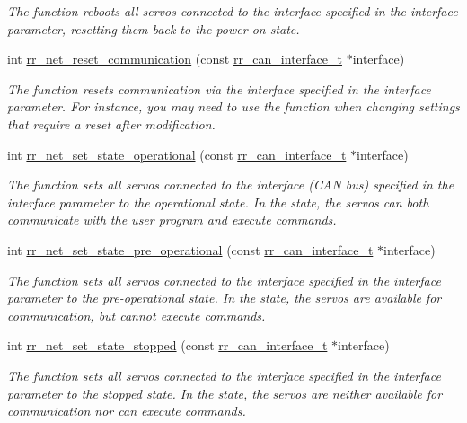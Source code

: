 \begin{DoxyCompactItemize}
\begin{DoxyCompactList}\small\item\em The function reboots all servos connected to the interface specified in the \textquotesingle{}interface\textquotesingle{} parameter, resetting them back to the power-\/on state. \end{DoxyCompactList}\item 
int \hyperlink{group___state_ga7591c01ec4b20388fad7effe3266e3b1}{rr\+\_\+net\+\_\+reset\+\_\+communication} (const \hyperlink{structrr__can__interface__t}{rr\+\_\+can\+\_\+interface\+\_\+t} $\ast$interface)
\begin{DoxyCompactList}\small\item\em The function resets communication via the interface specified in the \textquotesingle{}interface\textquotesingle{} parameter. For instance, you may need to use the function when changing settings that require a reset after modification. \end{DoxyCompactList}\item 
int \hyperlink{group___state_ga427f81205fc35a78a351d1288ea67165}{rr\+\_\+net\+\_\+set\+\_\+state\+\_\+operational} (const \hyperlink{structrr__can__interface__t}{rr\+\_\+can\+\_\+interface\+\_\+t} $\ast$interface)
\begin{DoxyCompactList}\small\item\em The function sets all servos connected to the interface (C\+AN bus) specified in the \textquotesingle{}interface\textquotesingle{} parameter to the operational state. In the state, the servos can both communicate with the user program and execute commands. \end{DoxyCompactList}\item 
int \hyperlink{group___state_ga6a6c46f69a8586cf7bd129a55a775eb7}{rr\+\_\+net\+\_\+set\+\_\+state\+\_\+pre\+\_\+operational} (const \hyperlink{structrr__can__interface__t}{rr\+\_\+can\+\_\+interface\+\_\+t} $\ast$interface)
\begin{DoxyCompactList}\small\item\em The function sets all servos connected to the interface specified in the \textquotesingle{}interface\textquotesingle{} parameter to the pre-\/operational state. In the state, the servos are available for communication, but cannot execute commands. \end{DoxyCompactList}\item 
int \hyperlink{group___state_ga7dd178eafeae0d80edd60e3aee6e13b9}{rr\+\_\+net\+\_\+set\+\_\+state\+\_\+stopped} (const \hyperlink{structrr__can__interface__t}{rr\+\_\+can\+\_\+interface\+\_\+t} $\ast$interface)
\begin{DoxyCompactList}\small\item\em The function sets all servos connected to the interface specified in the \textquotesingle{}interface\textquotesingle{} parameter to the stopped state. In the state, the servos are neither available for communication nor can execute commands. \end{DoxyCompactList}\end{DoxyCompactItemize}


